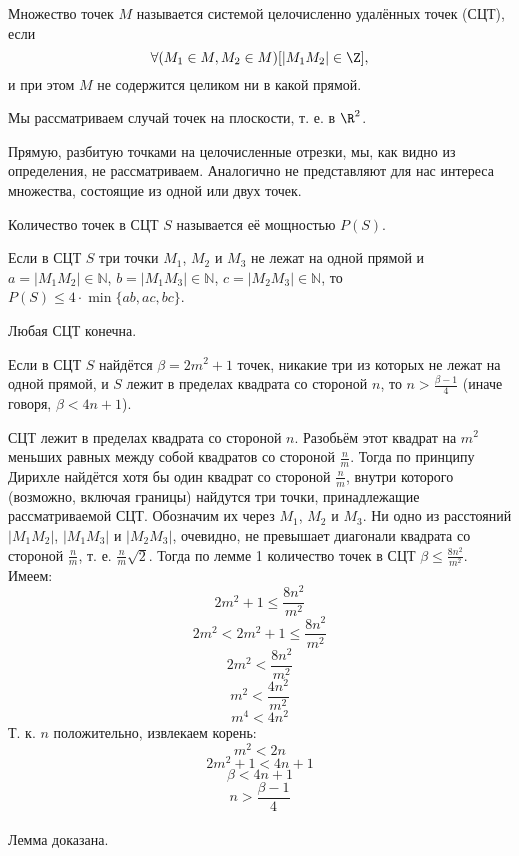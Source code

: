 

\linespread{1.468}
\large

\begin{opr}
	Множество точек $M$ называется системой целочисленно удалённых точек (СЦТ), если
	$$
		\forall(M_1 \in M, M_2\in M)[|M_1 M_2|\in\Z],
	$$
	и при этом $M$ не содержится целиком ни в какой прямой.
\end{opr}

\begin{zamech}
	Мы рассматриваем случай точек на плоскости, т. е. в $\R^2$.
\end{zamech}

\begin{zamech}
	Прямую, разбитую точками на целочисленные отрезки, мы, как видно из определения, не рассматриваем.
	Аналогично не представляют для нас интереса множества, состоящие из одной или двух точек.
\end{zamech}

\begin{opr}
	Количество точек в СЦТ $S$ называется её мощностью $P(S)$.
\end{opr}

\begin{lemma}\label{lemma_Semenova}
	Если в СЦТ $S$ три точки $M_1$, $M_2$ и $M_3$ не лежат на одной прямой и 
	$a=|M_1 M_2| \in \mathbb{N}$,
	$b=|M_1 M_3| \in \mathbb{N}$,
	$c=|M_2 M_3| \in \mathbb{N}$,
	то 
	$P(S) \leq 4\cdot\min\{ab,ac,bc\}$.
\end{lemma}

\begin{sledstvie}
	Любая СЦТ конечна.
\end{sledstvie}

\begin{lemma}\label{lemma_ocenka_bestriad_1}
	Если в СЦТ $S$ найдётся $\beta = 2m^2 +1$ точек, никакие три из которых не лежат на одной прямой,
	и $S$ лежит в пределах квадрата со стороной $n$,
	то $n > \frac{\beta - 1}{4}$ (иначе говоря, $ \beta < 4n +1$).
\end{lemma}

\dokvo
	СЦТ лежит в пределах квадрата со стороной $n$.
	Разобьём этот квадрат на $m^2$ меньших равных между собой квадратов со стороной $\frac{n}{m}$.
	Тогда по принципу Дирихле найдётся хотя бы один квадрат со стороной $\frac{n}{m}$,
	внутри которого (возможно, включая границы) найдутся три точки, принадлежащие рассматриваемой СЦТ.
	Обозначим их через $M_1$, $M_2$ и $M_3$.
	Ни одно из расстояний $|M_1 M_2|$, $|M_1 M_3|$ и $|M_2 M_3|$, очевидно, не превышает диагонали квадрата со стороной $\frac{n}{m}$,
	т. е. $\frac{n}{m}\sqrt{2}$.
	Тогда по лемме 1 количество точек в СЦТ $\beta \le \frac{8n^2}{m^2}$.
	Имеем:
	$$ 2m^2+1 \le \frac{8n^2}{m^2}$$
	$$ 2m^2 < 2m^2+1 \le \frac{8n^2}{m^2}$$
	$$ 2m^2 < \frac{8n^2}{m^2}$$
	$$ m^2 < \frac{4n^2}{m^2}$$
	$$ m^4 < 4n^2$$
	Т. к. $n$ положительно, извлекаем корень:
	$$ m^2 < 2n$$
	$$ 2m^2 +1 < 4n +1$$
	$$ \beta < 4n +1$$
	$$n > \frac{\beta - 1}{4}$$
\\ Лемма доказана.

